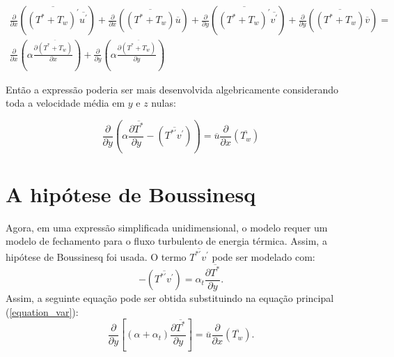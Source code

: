 \begin{equation}
\begin{split}
\frac{\partial{}}{\partial{x}} \left(\overline{(T^\ast + T_w)^\prime} \overline{ u^\prime}\right) + \frac{\partial{}}{\partial{x}}\left(\overline{(T^\ast + T_w)} \overline{u}\right)+ 
\frac{\partial{}}{\partial{y}} \left(\overline{(T^\ast + T_w)^\prime} \overline{ v^\prime}\right) + \frac{\partial{}}{\partial{y}}\left(\overline{(T^\ast + T_w)} \overline{v}\right) = \\
{\frac{\partial{}}{\partial{x}}} \left(\alpha {\frac{\partial{\overline{(T^\ast + T_w)}}}{\partial{x}}} \right) +
{\frac{\partial{}}{\partial{y}}} \left(\alpha {\frac{\partial{\overline{(T^\ast + T_w)}}}{\partial{y}}} \right) 
\end{split}
\end{equation}

Então a expressão poderia ser mais desenvolvida algebricamente considerando toda a velocidade média em $y$ e $z$ nulas:

\begin{equation}\label{equation_var}
{\frac{\partial{}}{\partial{y}}} \left(\alpha {\frac{\partial{\overline{T^\ast}}}{\partial{y}}}   
- \left(\overline{ T^{\ast\prime} v^\prime}\right) \right)
= 
\overline{u}\frac{\partial{}}{\partial{x}}\left(\overline{T_w}\right)  
\end{equation}



\section{A hipótese de Boussinesq}

Agora, em uma expressão simplificada unidimensional, o modelo requer um modelo de fechamento para o fluxo turbulento de energia térmica. Assim, a hipótese de Boussinesq foi usada. O termo $\overline{T^{\ast\prime}  v^\prime}$ pode ser modelado com:
\begin{equation}\label{bou}
-\left(\overline{ T^{\ast\prime}  v^\prime}\right) = 
\alpha_t \frac{\partial{\overline{T^\ast}}}{\partial{y}}.
\end{equation}
Assim, a seguinte equação pode ser obtida substituindo na equação principal (\ref{equation_var}):
\\
\begin{equation}
{\frac{\partial{}}{\partial{y}}} \left[(\alpha + \alpha_t)  \frac{\partial \overline{T^\ast}}{\partial y} \right]
= 
\overline{u}\frac{\partial{}}{\partial{x}}\left(\overline{T_w}\right) . 
\end{equation}

